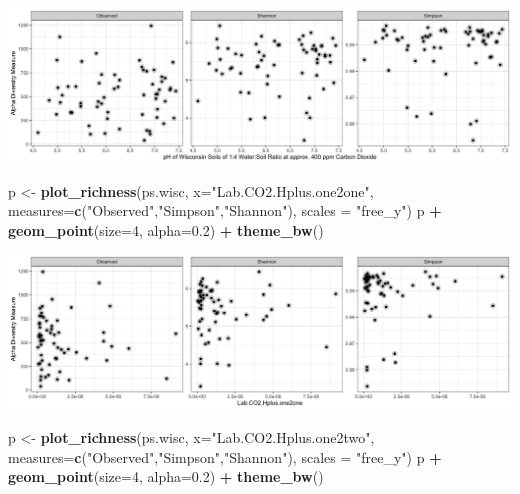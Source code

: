 \documentclass[]{article}
\newenvironment{Shaded}{\begin{snugshade}}{\end{snugshade}}
\newcommand{\DataTypeTok}[1]{\textcolor[rgb]{0.13,0.29,0.53}{#1}}
\newcommand{\DecValTok}[1]{\textcolor[rgb]{0.00,0.00,0.81}{#1}}
\newcommand{\FloatTok}[1]{\textcolor[rgb]{0.00,0.00,0.81}{#1}}
\newcommand{\KeywordTok}[1]{\textcolor[rgb]{0.13,0.29,0.53}{\textbf{#1}}}
\newcommand{\NormalTok}[1]{#1}
\newcommand{\OperatorTok}[1]{\textcolor[rgb]{0.81,0.36,0.00}{\textbf{#1}}}
\newcommand{\StringTok}[1]{\textcolor[rgb]{0.31,0.60,0.02}{#1}}
\begin{document}
\includegraphics{output-rmd/richness-ph-Lab.CO2.pH.one2four.wisc-1.png}

\begin{Shaded}
\begin{Highlighting}[]
\NormalTok{p <-}\StringTok{ }\KeywordTok{plot_richness}\NormalTok{(ps.wisc, }\DataTypeTok{x=}\StringTok{"Lab.CO2.Hplus.one2one"}\NormalTok{, }\DataTypeTok{measures=}\KeywordTok{c}\NormalTok{(}\StringTok{"Observed"}\NormalTok{,}\StringTok{"Simpson"}\NormalTok{,}\StringTok{"Shannon"}\NormalTok{), }\DataTypeTok{scales =} \StringTok{"free_y"}\NormalTok{)}
\NormalTok{p }\OperatorTok{+}\StringTok{ }\KeywordTok{geom_point}\NormalTok{(}\DataTypeTok{size=}\DecValTok{4}\NormalTok{, }\DataTypeTok{alpha=}\FloatTok{0.2}\NormalTok{) }\OperatorTok{+}\StringTok{ }\KeywordTok{theme_bw}\NormalTok{()}
\end{Highlighting}
\end{Shaded}

\includegraphics{output-rmd/richness-ph-Lab.CO2.Hplus.one2one.wisc-1.png}

\begin{Shaded}
\begin{Highlighting}[]
\NormalTok{p <-}\StringTok{ }\KeywordTok{plot_richness}\NormalTok{(ps.wisc, }\DataTypeTok{x=}\StringTok{"Lab.CO2.Hplus.one2two"}\NormalTok{, }\DataTypeTok{measures=}\KeywordTok{c}\NormalTok{(}\StringTok{"Observed"}\NormalTok{,}\StringTok{"Simpson"}\NormalTok{,}\StringTok{"Shannon"}\NormalTok{), }\DataTypeTok{scales =} \StringTok{"free_y"}\NormalTok{)}
\NormalTok{p }\OperatorTok{+}\StringTok{ }\KeywordTok{geom_point}\NormalTok{(}\DataTypeTok{size=}\DecValTok{4}\NormalTok{, }\DataTypeTok{alpha=}\FloatTok{0.2}\NormalTok{) }\OperatorTok{+}\StringTok{ }\KeywordTok{theme_bw}\NormalTok{()}
\end{Highlighting}
\end{Shaded}
\end{document}
